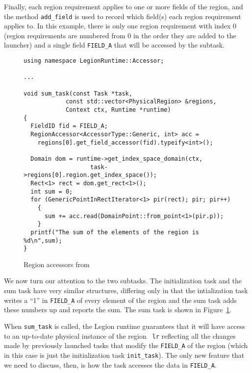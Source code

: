 Finally, each region requirement applies to one or more fields of the region, and the method {\tt add\_field} is
used to record which field(s) each region requirement applies to.
In this example, there is only one region requirement with index 0 (region requirements
are numbered from 0 in the order they are added to the launcher) and a single field {\tt FIELD\_A} that will be
accessed by the subtask.

\begin{figure}
{\small
\begin{lstlisting}
using namespace LegionRuntime::Accessor;

...

void sum_task(const Task *task,
		    const std::vector<PhysicalRegion> &regions,
		    Context ctx, Runtime *runtime)
{
  FieldID fid = FIELD_A;
  RegionAccessor<AccessorType::Generic, int> acc =
    regions[0].get_field_accessor(fid).typeify<int>();

  Domain dom = runtime->get_index_space_domain(ctx,
                   task->regions[0].region.get_index_space());
  Rect<1> rect = dom.get_rect<1>();
  int sum = 0;
  for (GenericPointInRectIterator<1> pir(rect); pir; pir++)
    {
      sum += acc.read(DomainPoint::from_point<1>(pir.p));
    }
  printf("The sum of the elements of the region is %d\n",sum);
}
\end{lstlisting}
}
\caption{Region accessors from }
\label{fig:accessors}
\end{figure}
We now turn our attention to the two subtasks.  The initialization task and the sum task have very similar
structures, differing only in that the intialization task writes a ``1'' in {\tt FIELD\_A} of every element of the region and
the sum task adds these numbers up and reports the sum.  The sum task is shown in Figure~\ref{fig:accessors}.

When {\tt sum\_task} is called, the Legion runtime guarantees that it
will have access to an up-to-date physical instance of the region {\tt
  lr} reflecting all the changes made by previously launched tasks
that modify the {\tt FIELD\_A} of the region (which in this case is
just the initialization task {\tt init\_task}).  The only new feature
that we need to discuss, then, is how the task accesses the data in {\tt FIELD\_A}.

